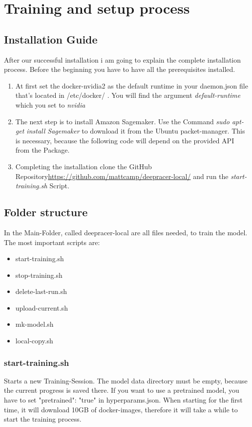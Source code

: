 \section{Training and setup process}

\subsection{Installation Guide}
After our successful installation i am going to explain the complete installation process. \newline Before the beginning you have to have all the prerequisites installed.

\begin{enumerate}
    \item At first set the docker-nvidia2 as the default runtime in your daemon.json file that's located in /etc/docker/ . You will find the argument \textsl{default-runtime} which you set to \textsl{nvidia} 
    \item The next step is to install Amazon Sagemaker. Use the Command \textsl{sudo apt-get install Sagemaker}  to download it from the Ubuntu packet-manager. This is necessary, because the following code will depend on the provided API from the Package.
    \item Completing the installation clone the GitHub Repository\url{https://github.com/mattcamp/deepracer-local/} and run the \textsl{start-training.sh} Script.
\end{enumerate}


\subsection{Folder structure}
In the Main-Folder, called deepracer-local are all files needed, to train the model.
The most important scripts are:

\begin{itemize}
    \item start-training.sh
    \item stop-training.sh
    \item delete-last-run.sh
    \item upload-current.sh
    \item mk-model.sh
    \item local-copy.sh
\end{itemize}

\subsubsection{start-training.sh}
Starts a new Training-Session. The model data directory must be empty, because the current progress is saved there. If you want to use a pretrained model, you have to set "pretrained": "true" in hyperparams.json. When starting for the first time, it will download 10GB of docker-images, therefore it will take a while to start the training process.

